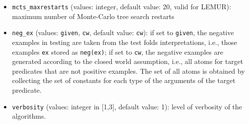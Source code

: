 \begin{itemize}
\item \verb|mcts_maxrestarts|  (values: integer, default value: 20, valid for LEMUR): maximum number of Monte-Carlo tree search restarts
\item \verb|neg_ex| (values:  \verb|given|, \verb|cw|, default value: \verb|cw|): if  set to \verb|given|, the negative examples in testing
are taken from the test folds interpretations, i.e., those examples \verb|ex| stored as \verb|neg(ex)|; if set to \verb|cw|, the negative examples are generated according to the closed world assumption, i.e., all atoms for target predicates that are not positive examples. The set of all atoms is obtained by collecting the set of constants for each type of the arguments of the target predicate.
\item \verb|verbosity| (values: integer in [1,3], default value: 1): level of verbosity of the algorithms.
\end{itemize}
